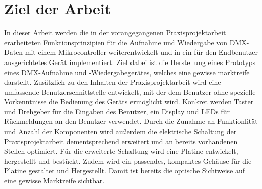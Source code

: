 
\newpage
\section{Ziel der Arbeit}

In dieser Arbeit werden die in der vorangegangenen Praxisprojektarbeit erarbeiteten Funktionsprinzipien für die Aufnahme und Wiedergabe von DMX-Daten mit einem Mikrocontroller weiterentwickelt und in ein für den Endbenutzer ausgerichtetes Gerät implementiert. Ziel dabei ist die Herstellung eines Prototyps eines DMX-Aufnahme und -Wiedergabegerätes, welches eine gewisse marktreife darstellt. Zusätzlich zu den Inhalten der Praxisprojektarbeit wird eine umfassende Benutzerschnittstelle entwickelt, mit der dem Benutzer ohne spezielle Vorkenntnisse die Bedienung des Geräts ermöglicht wird. Konkret werden Taster und Drehgeber für die Eingaben des Benutzer, ein Display und LEDs für Rückmeldungen an den Benutzer verwendet. Durch die Zunahme an Funktionlität und Anzahl der Komponenten wird außerdem die elektrische Schaltung der Praxisprojektarbeit dementsprechend erweitert und an bereits vorhandenen Stellen optimiert. Für die erweiterte Schaltung wird eine Platine entwickelt, hergestellt und bestückt. Zudem wird ein passendes, kompaktes Gehäuse für die Platine gestaltet und Hergestellt. Damit ist bereits die optische Sichtweise auf eine gewisse Marktreife sichtbar.

